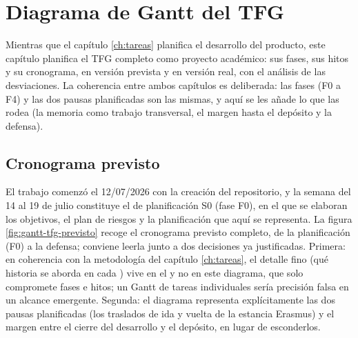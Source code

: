 
\chapter{Diagrama de Gantt del TFG}
\label{ch:gantt-tfg}

Mientras que el capítulo \ref{ch:tareas} planifica el desarrollo del producto, este capítulo planifica el \ac{TFG} completo como proyecto académico: sus fases, sus hitos y su cronograma, en versión prevista y en versión real, con el análisis de las desviaciones.
La coherencia entre ambos capítulos es deliberada: las fases (F0 a F4) y las dos pausas planificadas son las mismas, y aquí se les añade lo que las rodea (la memoria como trabajo transversal, el margen hasta el depósito y la defensa).

\section{Cronograma previsto}
\label{sec:gantt-previsto}

El trabajo comenzó el 12/07/2026 con la creación del repositorio, y la semana del 14 al 19 de julio constituye el  de planificación S0 (fase F0), en el que se elaboran los objetivos, el plan de riesgos y la planificación que aquí se representa.
La figura \ref{fig:gantt-tfg-previsto} recoge el cronograma previsto completo, de la planificación (F0) a la defensa; conviene leerla junto a dos decisiones ya justificadas.
Primera: en coherencia con la metodología del capítulo \ref{ch:tareas}, el detalle fino (qué historia se aborda en cada ) vive en el  y no en este diagrama, que solo compromete fases e hitos; un Gantt de tareas individuales sería precisión falsa en un alcance emergente.
Segunda: el diagrama representa explícitamente las dos pausas planificadas (los traslados de ida y vuelta de la estancia Erasmus) y el margen entre el cierre del desarrollo y el depósito, en lugar de esconderlos.

